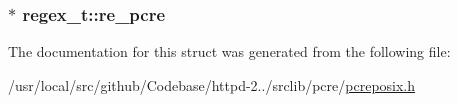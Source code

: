 \subsubsection[{\texorpdfstring{re\+\_\+pcre}{re_pcre}}]{$\ast$ regex\+\_\+t\+::re\+\_\+pcre}\hypertarget{structregex__t_ab3694f54105f125bc239be955f54143e}{}\label{structregex__t_ab3694f54105f125bc239be955f54143e}


The documentation for this struct was generated from the following file\+:\begin{DoxyCompactItemize}
\item 
/usr/local/src/github/\+Codebase/httpd-\/2../srclib/pcre/\hyperlink{pcreposix_8h}{pcreposix.\+h}\end{DoxyCompactItemize}
